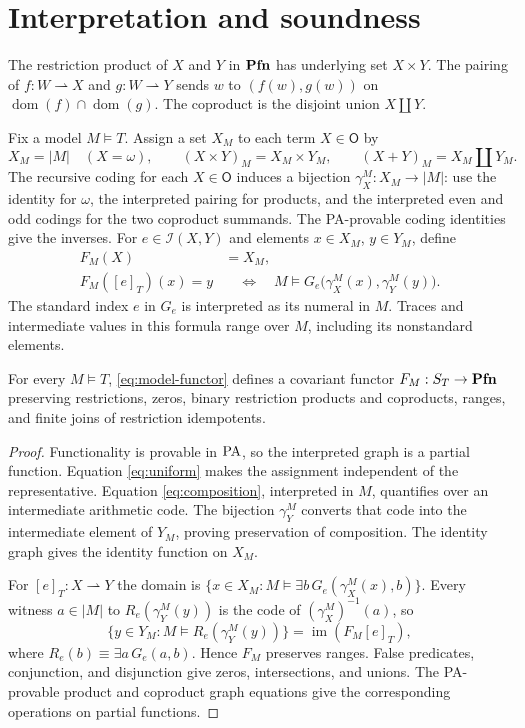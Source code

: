 \section{Interpretation and soundness}\label{sec:models}

The restriction product of $X$ and $Y$ in $\mathbf{Pfn}$ has underlying set
$X\times Y$. The pairing of $f:W\rightharpoonup X$ and
$g:W\rightharpoonup Y$ sends $w$ to $(f(w),g(w))$ on
$\operatorname{dom}(f)\cap\operatorname{dom}(g)$. The coproduct
is the disjoint union $X\amalg Y$.

Fix a model $M\models T$. Assign a set $X_M$ to each term
$X\in\mathsf O$ by
\[
 X_M=|M|\quad(X=\omega),\qquad
 (X\times Y)_M=X_M\times Y_M,\qquad
 (X+Y)_M=X_M\amalg Y_M.
\]
The recursive coding for each $X\in\mathsf O$ induces a bijection
$\gamma_X^M:X_M\to|M|$: use the identity for $\omega$, the
interpreted pairing for products, and the interpreted even and odd
codings for the two coproduct summands. The PA-provable coding
identities give the inverses. For $e\in\mathcal I(X,Y)$
and elements $x\in X_M$, $y\in Y_M$, define
\begin{equation}\label{eq:model-functor}
 \begin{aligned}
 F_M(X)&=X_M,\\
 F_M([e]_T)(x)=y
 &\quad\Longleftrightarrow\quad
 M\models G_e\bigl(\gamma_X^M(x),\gamma_Y^M(y)\bigr).
 \end{aligned}
\end{equation}
The standard index $e$ in $G_e$ is interpreted as its numeral in $M$.
Traces and intermediate values in this formula range over $M$,
including its nonstandard elements.

\begin{proposition}\label{prop:model}
For every $M\models T$, \eqref{eq:model-functor} defines a covariant
functor $F_M:S_T\to\mathbf{Pfn}$ preserving restrictions, zeros, binary
restriction products and coproducts, ranges, and finite joins of
restriction idempotents.
\end{proposition}
\begin{proof}
Functionality is provable in $\mathrm{PA}$, so the interpreted graph is a
partial function. Equation \eqref{eq:uniform} makes the assignment
independent of the representative. Equation \eqref{eq:composition},
interpreted in $M$, quantifies over an intermediate arithmetic code.
The bijection $\gamma_Y^M$ converts that code into the intermediate
element of $Y_M$, proving preservation of composition. The identity
graph gives the identity function on $X_M$.

For $[e]_T:X\rightharpoonup Y$ the domain is
$\{x\in X_M:M\models\exists b\,G_e(\gamma_X^M(x),b)\}$.
Every witness $a\in|M|$ to $R_e(\gamma_Y^M(y))$ is the code
of $(\gamma_X^M)^{-1}(a)$, so
\[
 \{y\in Y_M:M\models R_e(\gamma_Y^M(y))\}
 =\operatorname{im}(F_M[e]_T),
\]
where $R_e(b)\equiv\exists a\,G_e(a,b)$. Hence $F_M$ preserves ranges.
False predicates, conjunction, and disjunction
give zeros, intersections, and unions. The PA-provable product and
coproduct graph equations give the corresponding operations on
partial functions.
\end{proof}

